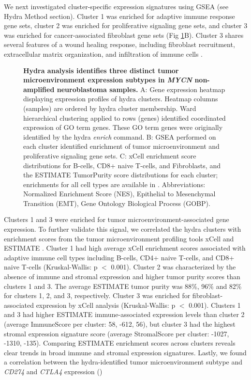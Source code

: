 \documentclass[10pt,letterpaper]{article}
\providecommand{\DIFaddtex}[1]{{\protect\color{blue}\uwave{#1}}} %
\providecommand{\DIFaddbegin}{} %
\providecommand{\DIFaddend}{} %
\providecommand{\DIFaddFL}[1]{\DIFadd{#1}} %
\providecommand{\DIFaddbeginFL}{} %
\providecommand{\DIFaddendFL}{} %
\providecommand{\DIFadd}[1]{\texorpdfstring{\DIFaddtex{#1}}{#1}} %
\newcommand{\DIFaddincludegraphics}[2][]{{\color{blue}\fbox{\DIFOincludegraphics[#1]{#2}}}} %
\DeclareRobustCommand{\DIFaddbegin}{\DIFOaddbegin \let\includegraphics\DIFaddincludegraphics} %
\DeclareRobustCommand{\DIFaddend}{\DIFOaddend \let\includegraphics\DIFOincludegraphics} %
\DeclareRobustCommand{\DIFaddbeginFL}{\DIFOaddbeginFL \let\includegraphics\DIFaddincludegraphics} %
\DeclareRobustCommand{\DIFaddendFL}{\DIFOaddendFL \let\includegraphics\DIFOincludegraphics} %
\begin{document}
We next investigated cluster-specific expression signatures using GSEA (see Hydra Method section). Cluster 1 was enriched for adaptive immune response gene sets, cluster 2 was enriched for proliferative signaling gene sets, and cluster 3 was enriched for cancer-associated fibroblast gene sets (Fig \ref{MYCN-NA}B). Cluster 3 shares several features of a wound healing response, including fibroblast recruitment, extracellular matrix organization, and infiltration of immune cells \cite{fosterEvolvingRelationshipWound}.

\begin{figure}[!h]
	\caption{{\bf Hydra analysis identifies three distinct tumor microenvironment expression subtypes in \textit{MYCN} non-amplified neuroblastoma samples.}
	A: Gene expression heatmap displaying expression profiles of hydra clusters. Heatmap columns (samples) are ordered by hydra cluster membership. Ward hierarchical clustering applied to rows (genes) identified coordinated expression of GO term genes. These GO term genes were originally identified by the hydra \textit{enrich} command. B: GSEA performed on each cluster identified enrichment of tumor microenvironment and proliferative signaling gene sets. C: xCell enrichment score distributions for B-cells, CD8+ naive T-cells, and Fibroblasts, and the ESTIMATE TumorPurity score distributions for each cluster; enrichments for all cell types are available in . Abbreviations: Normalized Enrichment Score (NES), Epithelial to Mesenchymal Transition (EMT), \DIFaddbeginFL \DIFaddFL{Extracellular Matrix (ECM), }\DIFaddendFL Gene Ontology Biological Process (GOBP).
	\label{MYCN-NA}}
\end{figure}

Clusters 1 and 3 were enriched for tumor microenvironment-associated gene expression. To further validate this signal, we correlated the hydra clusters with enrichment scores from the tumor microenvironment profiling tools xCell \cite{aranXCellDigitallyPortraying2017} and ESTIMATE \cite{yoshiharaInferringTumourPurity2013a}. Cluster 1 had high average xCell enrichment scores associated with adaptive immune cell types including B-cells, CD4+ naive T-cells, and CD8+ naive T-cells (Kruskal-Wallis: p $<$ 0.001). Cluster 2 was characterized by the absence of immune and stromal expression and higher tumor purity scores than clusters 1 and 3. The average ESTIMATE tumor purity was 88\%, 96\% and 82\% for clusters 1, 2, and 3, respectively. Cluster 3 was enriched for fibroblast-associated expression by xCell analysis (Kruskal-Wallis: p $<$ 0.001). Clusters 1 and 3 had higher ESTIMATE immune-associated expression levels than cluster 2 (average ImmuneScore per cluster: 58, -612, 56), but cluster 3 had the highest stromal expression signature score (average StromalScore per cluster: -1027, -1310, -135). Comparing ESTIMATE enrichment scores across clusters reveals clear trends in broad immune and stromal expression signatures. Lastly, we found a correlation between the hydra-identified tumor microenvironment subtype and \textit{CD274} and \textit{CTLA4} expression ()\DIFaddbegin \DIFadd{.
}\DIFaddend 
\end{document}
